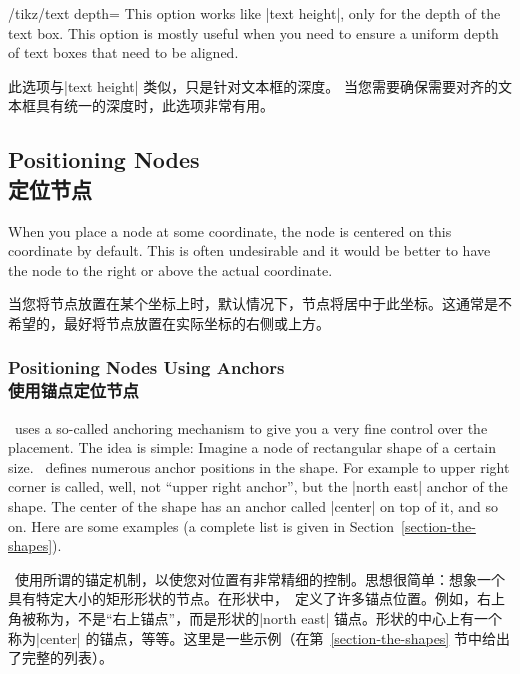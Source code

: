 \begin{key}{/tikz/text depth=}
    This option works like |text height|, only for the depth of the text box.
    This option is mostly useful when you need to ensure a uniform depth of
    text boxes that need to be aligned.

    此选项与|text height| 类似，只是针对文本框的深度。
    当您需要确保需要对齐的文本框具有统一的深度时，此选项非常有用。


\end{key}


\subsection{Positioning Nodes\\定位节点}
\label{section-nodes-anchors}

When you place a node at some coordinate, the node is centered on this
coordinate by default. This is often undesirable and it would be better to have
the node to the right or above the actual coordinate.

当您将节点放置在某个坐标上时，默认情况下，节点将居中于此坐标。这通常是不希望的，最好将节点放置在实际坐标的右侧或上方。


\subsubsection{Positioning Nodes Using Anchors\\使用锚点定位节点}

\pgfname\ uses a so-called anchoring mechanism to give you a very fine control
over the placement. The idea is simple: Imagine a node of rectangular shape of
a certain size. \pgfname\ defines numerous anchor positions in the shape. For
example to upper right corner is called, well, not ``upper right anchor'', but
the |north east| anchor of the shape. The center of the shape has an anchor
called |center| on top of it, and so on. Here are some examples (a complete
list is given in Section~\ref{section-the-shapes}).

\pgfname\ 使用所谓的锚定机制，以使您对位置有非常精细的控制。思想很简单：想象一个具有特定大小的矩形形状的节点。在形状中，\pgfname\ 定义了许多锚点位置。例如，右上角被称为，不是“右上锚点”，而是形状的|north east| 锚点。形状的中心上有一个称为|center| 的锚点，等等。这里是一些示例（在第~\ref{section-the-shapes} 节中给出了完整的列表）。

\medskip\noindent
{}

